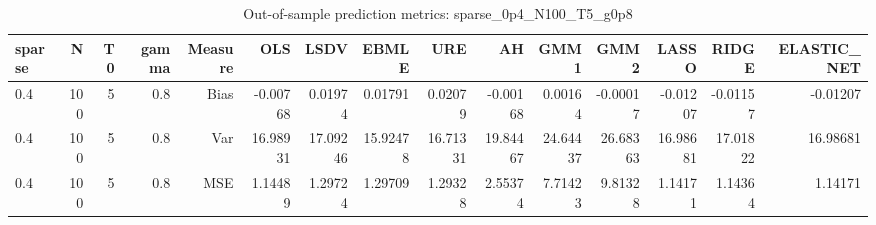 \begin{table}[!htbp]\centering
\caption{Out-of-sample prediction metrics: sparse_0p4_N100_T5_g0p8}
\label{tab:table3_sparse_0p4_N100_T5_g0p8}
\begin{tabular}{lrrrrrrrrrrrrrr}
\hline
sparse & N & T0 & gamma & Measure & OLS & LSDV & EBMLE & URE & AH & GMM1 & GMM2 & LASSO & RIDGE & ELASTIC_NET \\
\hline
0.4 & 100 & 5 & 0.8 & Bias & -0.00768 & 0.01974 & 0.01791 & 0.02079 & -0.00168 & 0.00164 & -0.00017 & -0.01207 & -0.01157 & -0.01207 \\
0.4 & 100 & 5 & 0.8 & Var & 16.98931 & 17.09246 & 15.92478 & 16.71331 & 19.84467 & 24.64437 & 26.68363 & 16.98681 & 17.01822 & 16.98681 \\
0.4 & 100 & 5 & 0.8 & MSE & 1.14489 & 1.29724 & 1.29709 & 1.29328 & 2.55374 & 7.71423 & 9.81328 & 1.14171 & 1.14364 & 1.14171 \\
\hline
\end{tabular}
\end{table}

